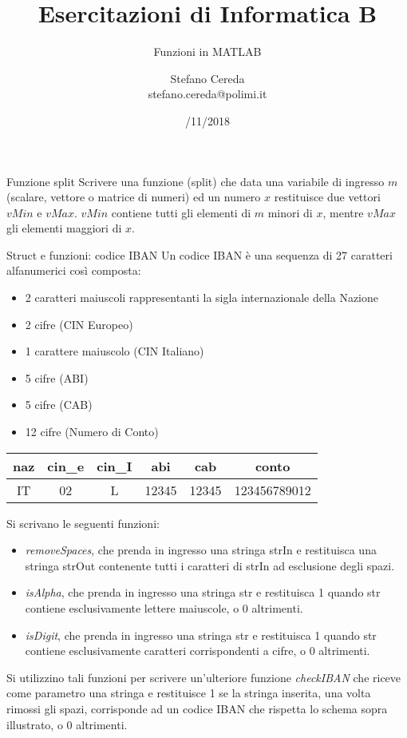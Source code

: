 \documentclass[format=169, handout, 10pt]{beamer}
\title{Esercitazioni di Informatica B}
\subtitle{Funzioni in MATLAB}
\author{Stefano Cereda\\
	stefano.cereda@polimi.it
}
\date{/11/2018}
\institute[PoliMi]{\vspace{0.5cm}\centering Politecnico di Milano \\ \vspace{0.2cm}
	\texttt{[image: ../logopolimi]}}
\begin{document}
	\begin{frame}
	\maketitle
\end{frame}

\begin{frame}{Funzione split}
Scrivere una funzione (split) che data una variabile di ingresso $m$ (scalare, vettore o
matrice di numeri) ed un numero $x$ restituisce due vettori $vMin$ e $vMax$. $vMin$
contiene tutti gli elementi di $m$ minori di $x$, mentre $vMax$ gli elementi maggiori
di $x$.
\end{frame}

\begin{frame}[allowframebreaks]{Struct e funzioni: codice IBAN}
Un codice IBAN è una sequenza di 27 caratteri alfanumerici così composta:
\begin{itemize}
\item 2 caratteri maiuscoli rappresentanti la sigla internazionale della Nazione
\item 2 cifre (CIN Europeo)
\item 1 carattere maiuscolo (CIN Italiano)
\item 5 cifre (ABI)
\item 5 cifre (CAB)
\item 12 cifre (Numero di Conto)
\end{itemize}
\begin{tabular}{|c|c|c|c|c|c|}
	\hline
	naz & cin\_e & cin\_I & abi & cab	&	conto \\
	\hline
	IT&02&L&12345&12345&123456789012\\
	\hline
\end{tabular}


Si scrivano le seguenti funzioni:
\begin{itemize}
\item \emph{removeSpaces}, che prenda in ingresso una stringa strIn e restituisca una stringa strOut contenente tutti i caratteri di strIn ad esclusione degli spazi.
\item \emph{isAlpha}, che prenda in ingresso una stringa str e restituisca 1 quando str contiene esclusivamente lettere maiuscole, o 0 altrimenti.
\item \emph{isDigit}, che prenda in ingresso una stringa str e restituisca 1 quando str contiene esclusivamente caratteri corrispondenti a cifre, o 0 altrimenti.
\end{itemize}

Si utilizzino tali funzioni per scrivere un’ulteriore funzione \emph{checkIBAN} che riceve come parametro una stringa e restituisce 1 se la stringa inserita, una volta rimossi gli spazi, corrisponde ad un codice IBAN che rispetta lo schema sopra illustrato, o 0 altrimenti.
\end{frame}
\end{document}
